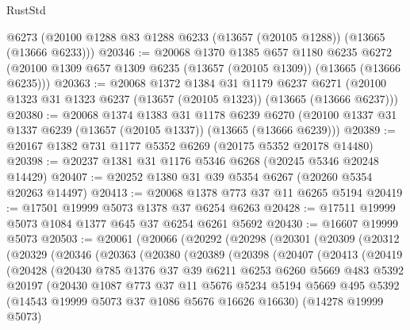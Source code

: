 \begin{lexlean}{RustStd}
\begin{coremodule}
    @6273
    (@20100 @1288 @83 @1288 @6233 (@13657 (@20105 @1288)) (@13665 (@13666 @6233)))
@20346 := @20068
    @1370
    @1385
    @657
    @1180
    @6235
    @6272
    (@20100 @1309 @657 @1309 @6235 (@13657 (@20105 @1309)) (@13665 (@13666 @6235)))
@20363 := @20068
    @1372
    @1384
    @31
    @1179
    @6237
    @6271
    (@20100 @1323 @31 @1323 @6237 (@13657 (@20105 @1323)) (@13665 (@13666 @6237)))
@20380 := @20068
    @1374
    @1383
    @31
    @1178
    @6239
    @6270
    (@20100 @1337 @31 @1337 @6239 (@13657 (@20105 @1337)) (@13665 (@13666 @6239)))
@20389 := @20167 @1382 @731 @1177 @5352 @6269 (@20175 @5352 @20178 @14480)
@20398 := @20237 @1381 @31 @1176 @5346 @6268 (@20245 @5346 @20248 @14429)
@20407 := @20252 @1380 @31 @39 @5354 @6267 (@20260 @5354 @20263 @14497)
@20413 := @20068 @1378 @773 @37 @11 @6265 @5194
@20419 := @17501 @19999 @5073 @1378 @37 @6254 @6263
@20428 := @17511 @19999 @5073 @1084 @1377 @645 @37 @6254 @6261 @5692
@20430 := @16607 @19999 @5073
@20503 := @20061
    (@20066
      (@20292
        (@20298
          (@20301
            (@20309
              (@20312
                (@20329
                  (@20346
                    (@20363
                      (@20380
                        (@20389
                          (@20398
                            (@20407
                              (@20413
                                (@20419
                                  (@20428
                                    (@20430
                                      @785
                                      @1376
                                      @37
                                      @39
                                      @6211
                                      @6253
                                      @6260
                                      @5669
                                      @483
                                      @5392
                                      @20197
                                      (@20430
                                        @1087
                                        @773
                                        @37
                                        @11
                                        @5676
                                        @5234
                                        @5194
                                        @5669
                                        @495
                                        @5392
                                        (@14543 @19999 @5073 @37 @1086 @5676 @16626 @16630)
                                        (@14278 @19999 @5073)

\end{coremodule}
\end{lexlean}
